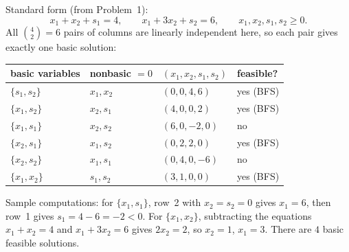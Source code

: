 \begin{solutions}
  \item Standard form (from Problem~1):
        \[
          x_{1}+x_{2}+s_{1}=4,\qquad
          x_{1}+3x_{2}+s_{2}=6,\qquad
          x_{1},x_{2},s_{1},s_{2}\ge 0 .
        \]
        All $\binom{4}{2}=6$ pairs of columns are linearly independent
        here, so each pair gives exactly one basic solution:
        \begin{center}
        \begin{tabular}{llll}
          \hline
          basic variables & nonbasic $=0$ &
          $(x_{1},x_{2},s_{1},s_{2})$ & feasible?\\
          \hline
          $\{s_{1},s_{2}\}$ & $x_{1},x_{2}$ & $(0,0,4,6)$ & yes (BFS)\\
          $\{x_{1},s_{2}\}$ & $x_{2},s_{1}$ & $(4,0,0,2)$ & yes (BFS)\\
          $\{x_{1},s_{1}\}$ & $x_{2},s_{2}$ & $(6,0,-2,0)$ & no\\
          $\{x_{2},s_{1}\}$ & $x_{1},s_{2}$ & $(0,2,2,0)$ & yes (BFS)\\
          $\{x_{2},s_{2}\}$ & $x_{1},s_{1}$ & $(0,4,0,-6)$ & no\\
          $\{x_{1},x_{2}\}$ & $s_{1},s_{2}$ & $(3,1,0,0)$ & yes (BFS)\\
          \hline
        \end{tabular}
        \end{center}
        Sample computations: for $\{x_{1},s_{1}\}$, row~2 with
        $x_{2}=s_{2}=0$ gives $x_{1}=6$, then row~1 gives
        $s_{1}=4-6=-2<0$. For $\{x_{1},x_{2}\}$, subtracting the equations
        $x_{1}+x_{2}=4$ and $x_{1}+3x_{2}=6$ gives $2x_{2}=2$, so
        $x_{2}=1$, $x_{1}=3$. There are $4$ basic feasible solutions.


\end{solutions}
